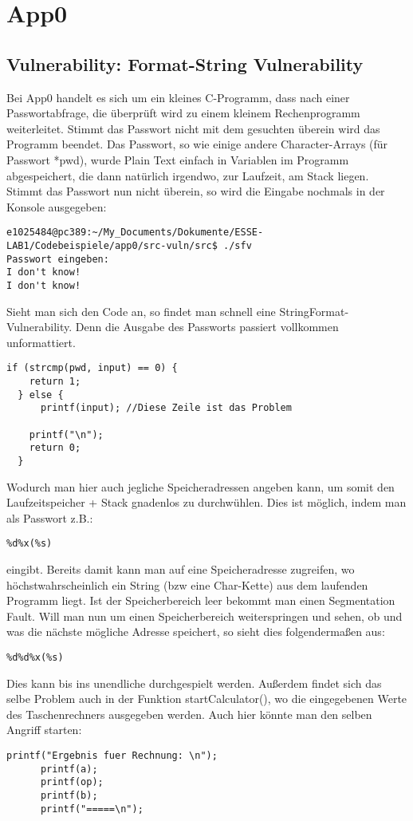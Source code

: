 \section{App0}
\subsection{Vulnerability: Format-String Vulnerability}
Bei App0 handelt es sich um ein kleines C-Programm, dass nach einer Passwortabfrage, die überprüft wird zu einem kleinem Rechenprogramm weiterleitet. Stimmt das Passwort nicht mit dem gesuchten überein wird das Programm beendet. Das Passwort, so wie einige andere Character-Arrays (für Passwort *pwd), wurde Plain Text einfach in Variablen im Programm abgespeichert, die dann natürlich irgendwo, zur Laufzeit, am Stack liegen.\linebreak
Stimmt das Passwort nun nicht überein, so wird die Eingabe nochmals in der Konsole ausgegeben:
\begin{lstlisting}
e1025484@pc389:~/My_Documents/Dokumente/ESSE-LAB1/Codebeispiele/app0/src-vuln/src$ ./sfv
Passwort eingeben: 
I don't know!
I don't know!

\end{lstlisting}
Sieht man sich den Code an, so findet man schnell eine StringFormat-Vulnerability. Denn die Ausgabe des Passworts passiert vollkommen unformattiert.
\begin{lstlisting}
if (strcmp(pwd, input) == 0) {
    return 1;
  } else {
      printf(input); //Diese Zeile ist das Problem
    
    printf("\n");
    return 0;
  }
\end{lstlisting}
Wodurch man hier auch jegliche Speicheradressen angeben kann, um somit den Laufzeitspeicher + Stack gnadenlos zu durchwühlen. Dies ist möglich, indem man
als Passwort z.B.:
\begin{lstlisting}
%d%x(%s)
\end{lstlisting}
eingibt. Bereits damit kann man auf eine Speicheradresse zugreifen, wo höchstwahrscheinlich ein String (bzw eine Char-Kette) aus dem laufenden Programm liegt.
Ist der Speicherbereich leer bekommt man einen Segmentation Fault. Will man nun um einen Speicherbereich weiterspringen
und sehen, ob und was die nächste mögliche Adresse speichert, so sieht dies folgendermaßen aus:
\begin{lstlisting}
%d%d%x(%s)
\end{lstlisting}
Dies kann bis ins unendliche durchgespielt werden. Außerdem findet sich das selbe Problem auch in der Funktion startCalculator(),
wo die eingegebenen Werte des Taschenrechners ausgegeben werden. Auch hier könnte man den selben Angriff starten:
\begin{lstlisting}
printf("Ergebnis fuer Rechnung: \n");
      printf(a);
      printf(op);
      printf(b);
      printf("=====\n");
\end{lstlisting}
